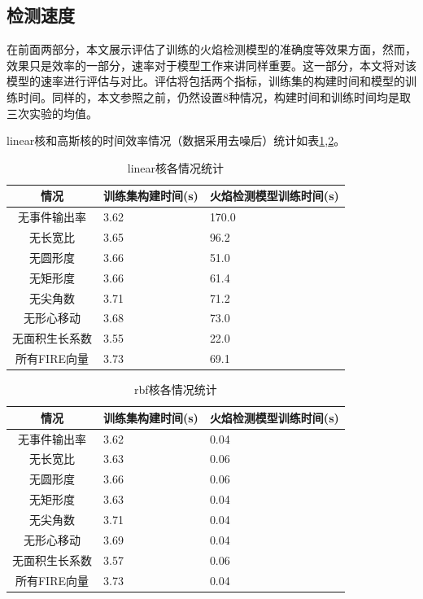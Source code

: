 \subsection{检测速度}
在前面两部分，本文展示评估了训练的火焰检测模型的准确度等效果方面，然而，效果只是效率的一部分，速率对于模型工作来讲同样重要。这一部分，本文将对该模型的速率进行评估与对比。评估将包括两个指标，训练集的构建时间和模型的训练时间。同样的，本文参照之前，仍然设置8种情况，构建时间和训练时间均是取三次实验的均值。

linear核和高斯核的时间效率情况（数据采用去噪后）统计如表\ref{t_linear},\ref{t_rbf}。
\begin{table}[ht]
    \centering
    \caption{linear核各情况统计}
    \begin{tabularx}{0.7\textwidth}{c|X|X}
        \toprule
        情况&训练集构建时间(s)&火焰检测模型训练时间(s)\\
        \midrule
        无事件输出率&3.62&170.0\\
        无长宽比&3.65&96.2\\
        无圆形度&3.66&51.0\\
        无矩形度&3.66&61.4\\
        无尖角数&3.71&71.2\\
        无形心移动&3.68&73.0\\
        无面积生长系数&3.55&22.0\\
        所有FIRE向量&3.73&69.1\\
        \bottomrule
    \end{tabularx}
    \label{t_linear}
\end{table}



\begin{table}[ht]
    \centering
    \caption{rbf核各情况统计}
    \begin{tabularx}{0.7\textwidth}{c|X|X}
        \toprule
        情况&训练集构建时间(s)&火焰检测模型训练时间(s)\\
        \midrule
        无事件输出率&3.62&0.04\\
        无长宽比&3.63&0.06\\
        无圆形度&3.66&0.06\\
        无矩形度&3.63&0.04\\
        无尖角数&3.71&0.04\\
        无形心移动&3.69&0.04\\
        无面积生长系数&3.57&0.06\\
        所有FIRE向量&3.73&0.04\\
        \bottomrule
    \end{tabularx}
    \label{t_rbf}
\end{table}

